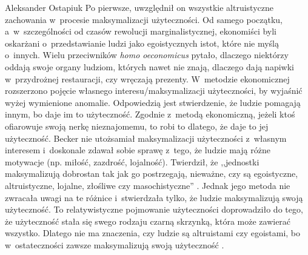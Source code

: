 \begin{artplenv}{Aleksander Ostapiuk}
Po pierwsze, uwzględnił on wszystkie altruistyczne zachowania w~procesie maksymalizacji użyteczności. Od samego początku,
a~w~szczególności od czasów rewolucji marginalistycznej, ekonomiści byli oskarżani o~przedstawianie ludzi jako
egoistycznych istot, które nie myślą o~innych. Wielu przeciwników \textit{homo oeconomicus} pytało, dlaczego niektórzy
oddają swoje organy ludziom, których nawet nie znają, dlaczego dają napiwki w~przydrożnej restauracji, czy wręczają
prezenty. W~metodzie ekonomicznej rozszerzono pojęcie własnego interesu/maksymalizacji użyteczności, by wyjaśnić wyżej
wymienione anomalie. Odpowiedzią jest stwierdzenie, że ludzie pomagają innym, bo daje im to użyteczność.
Zgodnie z~metodą ekonomiczną, jeżeli ktoś ofiarowuje swoją nerkę nieznajomemu, to robi to dlatego, że daje to jej
użyteczność. Becker nie utożsamiał maksymalizacji użyteczności z~własnym interesem i~doskonale zdawał sobie
sprawę z~tego, że ludzie mają różne motywacje (np. miłość, zazdrość, lojalność). Twierdził, że ,,jednostki maksymalizują
dobrostan tak jak go postrzegają, nieważne, czy są egoistyczne, altruistyczne, lojalne, złośliwe czy masochistyczne''
\parencite[s.~386]{becker_economic_1993}.
Jednak jego metoda nie zwracała uwagi na te różnice i~stwierdzała
tylko, że ludzie maksymalizują swoją użyteczność. To relatywistyczne pojmowanie użyteczności doprowadziło do tego, że
użyteczność stała się swego rodzaju czarną skrzynką, która może zawierać wszystko. Dlatego nie ma znaczenia, czy ludzie
są altruistami czy egoistami, bo w~ostateczności zawsze maksymalizują swoją użyteczność
\parencite{sen_rational_1977}.


\end{artplenv}
